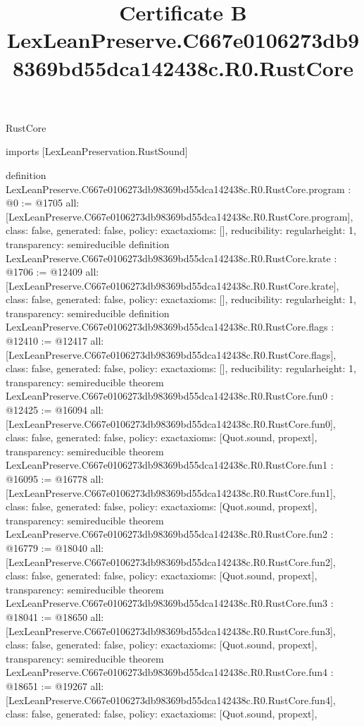 \begin{lexlean}{RustCore}
\title{Certificate B LexLeanPreserve.C667e0106273db98369bd55dca142438c.R0.RustCore}
\begin{coremodule}
imports [LexLeanPreservation.RustSound]

definition LexLeanPreserve.C667e0106273db98369bd55dca142438c.R0.RustCore.program : @0 := @1705 {
  all: [LexLeanPreserve.C667e0106273db98369bd55dca142438c.R0.RustCore.program],
  class: false,
  generated: false,
  policy: exact{axioms: []},
  reducibility: regular{height: 1},
  transparency: semireducible
}
definition LexLeanPreserve.C667e0106273db98369bd55dca142438c.R0.RustCore.krate : @1706 := @12409 {
  all: [LexLeanPreserve.C667e0106273db98369bd55dca142438c.R0.RustCore.krate],
  class: false,
  generated: false,
  policy: exact{axioms: []},
  reducibility: regular{height: 1},
  transparency: semireducible
}
definition LexLeanPreserve.C667e0106273db98369bd55dca142438c.R0.RustCore.flags : @12410 := @12417 {
  all: [LexLeanPreserve.C667e0106273db98369bd55dca142438c.R0.RustCore.flags],
  class: false,
  generated: false,
  policy: exact{axioms: []},
  reducibility: regular{height: 1},
  transparency: semireducible
}
theorem LexLeanPreserve.C667e0106273db98369bd55dca142438c.R0.RustCore.fun0 : @12425 := @16094 {
  all: [LexLeanPreserve.C667e0106273db98369bd55dca142438c.R0.RustCore.fun0],
  class: false,
  generated: false,
  policy: exact{axioms: [Quot.sound, propext]},
  transparency: semireducible
}
theorem LexLeanPreserve.C667e0106273db98369bd55dca142438c.R0.RustCore.fun1 : @16095 := @16778 {
  all: [LexLeanPreserve.C667e0106273db98369bd55dca142438c.R0.RustCore.fun1],
  class: false,
  generated: false,
  policy: exact{axioms: [Quot.sound, propext]},
  transparency: semireducible
}
theorem LexLeanPreserve.C667e0106273db98369bd55dca142438c.R0.RustCore.fun2 : @16779 := @18040 {
  all: [LexLeanPreserve.C667e0106273db98369bd55dca142438c.R0.RustCore.fun2],
  class: false,
  generated: false,
  policy: exact{axioms: [Quot.sound, propext]},
  transparency: semireducible
}
theorem LexLeanPreserve.C667e0106273db98369bd55dca142438c.R0.RustCore.fun3 : @18041 := @18650 {
  all: [LexLeanPreserve.C667e0106273db98369bd55dca142438c.R0.RustCore.fun3],
  class: false,
  generated: false,
  policy: exact{axioms: [Quot.sound, propext]},
  transparency: semireducible
}
theorem LexLeanPreserve.C667e0106273db98369bd55dca142438c.R0.RustCore.fun4 : @18651 := @19267 {
  all: [LexLeanPreserve.C667e0106273db98369bd55dca142438c.R0.RustCore.fun4],
  class: false,
  generated: false,
  policy: exact{axioms: [Quot.sound, propext]},
}
\end{coremodule}
\end{lexlean}
